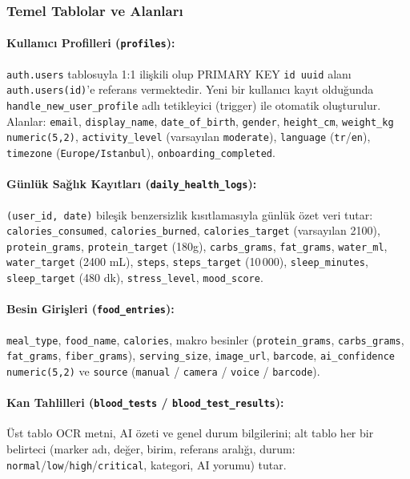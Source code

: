 \subsubsection{Temel Tablolar ve Alanları}

\paragraph{Kullanıcı Profilleri (\texttt{profiles}):}
\texttt{auth.users} tablosuyla 1:1 ilişkili olup PRIMARY KEY \texttt{id uuid} alanı \texttt{auth.users(id)}'e referans vermektedir. Yeni bir kullanıcı kayıt olduğunda \texttt{handle\_new\_user\_profile} adlı tetikleyici (trigger) ile otomatik oluşturulur. Alanlar: \texttt{email}, \texttt{display\_name}, \texttt{date\_of\_birth}, \texttt{gender}, \texttt{height\_cm}, \texttt{weight\_kg numeric(5,2)}, \texttt{activity\_level} (varsayılan \texttt{moderate}), \texttt{language} (\texttt{tr}/\texttt{en}), \texttt{timezone} (\texttt{Europe/Istanbul}), \texttt{onboarding\_completed}.

\paragraph{Günlük Sağlık Kayıtları (\texttt{daily\_health\_logs}):}
\texttt{(user\_id, date)} bileşik benzersizlik kısıtlamasıyla günlük özet veri tutar: \texttt{calories\_consumed}, \texttt{calories\_burned}, \texttt{calories\_target} (varsayılan 2100), \texttt{protein\_grams}, \texttt{protein\_target} (180g), \texttt{carbs\_grams}, \texttt{fat\_grams}, \texttt{water\_ml}, \texttt{water\_target} (2400 mL), \texttt{steps}, \texttt{steps\_target} (10\,000), \texttt{sleep\_minutes}, \texttt{sleep\_target} (480 dk), \texttt{stress\_level}, \texttt{mood\_score}.

\paragraph{Besin Girişleri (\texttt{food\_entries}):}
\texttt{meal\_type}, \texttt{food\_name}, \texttt{calories}, makro besinler (\texttt{protein\_grams}, \texttt{carbs\_grams}, \texttt{fat\_grams}, \texttt{fiber\_grams}), \texttt{serving\_size}, \texttt{image\_url}, \texttt{barcode}, \texttt{ai\_confidence numeric(5,2)} ve \texttt{source} (\texttt{manual} / \texttt{camera} / \texttt{voice} / \texttt{barcode}).

\paragraph{Kan Tahlilleri (\texttt{blood\_tests} / \texttt{blood\_test\_results}):}
Üst tablo OCR metni, AI özeti ve genel durum bilgilerini; alt tablo her bir belirteci (marker adı, değer, birim, referans aralığı, durum: \texttt{normal}/\texttt{low}/\texttt{high}/\texttt{critical}, kategori, AI yorumu) tutar.

